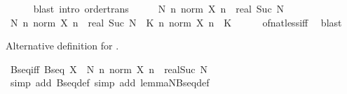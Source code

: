 \begin{isabellebody}
\ \ \ \ \isamarkupfalse%
\ {\isacharparenleft}{\kern0pt}blast\ intro{\isacharcolon}{\kern0pt}\ order{\isacharunderscore}{\kern0pt}trans{\isacharparenright}{\kern0pt}\isanewline
\ \ \isamarkupfalse%
\ \isamarkupfalse%
\ {\isachardoublequoteopen}{\isasymexists}N{\isachardot}{\kern0pt}\ {\isasymforall}n{\isachardot}{\kern0pt}\ norm\ {\isacharparenleft}{\kern0pt}X\ n{\isacharparenright}{\kern0pt}\ {\isasymle}\ real\ {\isacharparenleft}{\kern0pt}Suc\ N{\isacharparenright}{\kern0pt}{\isachardoublequoteclose}\ \isacommand{{\isachardot}{\kern0pt}{\isachardot}{\kern0pt}}\isamarkupfalse%
\isanewline
{}\isamarkupfalse%
\isanewline
\ \ \isamarkupfalse%
\ {\isachardoublequoteopen}{\isasymAnd}N{\isachardot}{\kern0pt}\ {\isasymforall}n{\isachardot}{\kern0pt}\ norm\ {\isacharparenleft}{\kern0pt}X\ n{\isacharparenright}{\kern0pt}\ {\isasymle}\ real\ {\isacharparenleft}{\kern0pt}Suc\ N{\isacharparenright}{\kern0pt}\ {\isasymLongrightarrow}\ {\isasymexists}K{\isachargreater}{\kern0pt}{}{\isachardot}{\kern0pt}\ {\isasymforall}n{\isachardot}{\kern0pt}\ norm\ {\isacharparenleft}{\kern0pt}X\ n{\isacharparenright}{\kern0pt}\ {\isasymle}\ K{\isachardoublequoteclose}\isanewline
\ \ \ \ \isamarkupfalse%
\ of{\isacharunderscore}{\kern0pt}nat{\isacharunderscore}{\kern0pt}{}{\isacharunderscore}{\kern0pt}less{\isacharunderscore}{\kern0pt}iff\ \isamarkupfalse%
\ blast\isanewline
{}\isamarkupfalse%
%
\endisatagproof
{\isafoldproof}%
%
\isadelimproof
%
\endisadelimproof
%
\begin{isamarkuptext}%
Alternative definition for .%
\end{isamarkuptext}\isamarkuptrue%
\isamarkupfalse%
\ Bseq{\isacharunderscore}{\kern0pt}iff{\isacharcolon}{\kern0pt}\ {\isachardoublequoteopen}Bseq\ X\ {\isasymlongleftrightarrow}\ {\isacharparenleft}{\kern0pt}{\isasymexists}N{\isachardot}{\kern0pt}\ {\isasymforall}n{\isachardot}{\kern0pt}\ norm\ {\isacharparenleft}{\kern0pt}X\ n{\isacharparenright}{\kern0pt}\ {\isasymle}\ real{\isacharparenleft}{\kern0pt}Suc\ N{\isacharparenright}{\kern0pt}{\isacharparenright}{\kern0pt}{\isachardoublequoteclose}\isanewline
%
\isadelimproof
\ \ %
\endisadelimproof
%
\isatagproof
{}\isamarkupfalse%
\ {\isacharparenleft}{\kern0pt}simp\ add{\isacharcolon}{\kern0pt}\ Bseq{\isacharunderscore}{\kern0pt}def{\isacharparenright}{\kern0pt}\ {\isacharparenleft}{\kern0pt}simp\ add{\isacharcolon}{\kern0pt}\ lemma{\isacharunderscore}{\kern0pt}NBseq{\isacharunderscore}{\kern0pt}def{\isacharparenright}{\kern0pt}%

\end{isabellebody}

